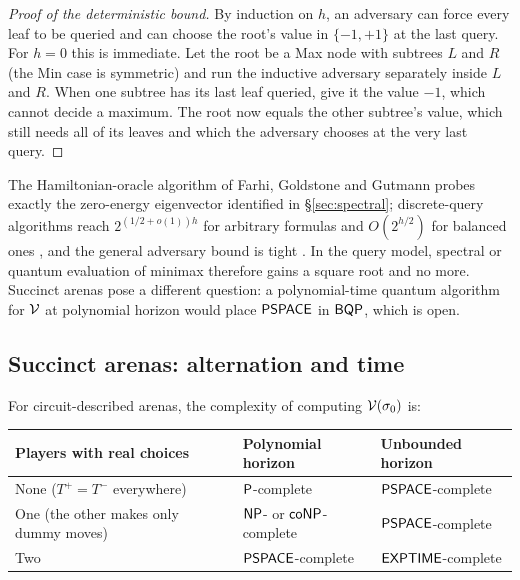 \begin{proof}[Proof of the deterministic bound]
By induction on $h$, an adversary can force every leaf to be queried and can choose the root's value in $\{-1,+1\}$ at the last query. For $h=0$ this is immediate. Let the root be a Max node with subtrees $L$ and $R$ (the Min case is symmetric) and run the inductive adversary separately inside $L$ and $R$. When one subtree has its last leaf queried, give it the value $-1$, which cannot decide a maximum. The root now equals the other subtree's value, which still needs all of its leaves and which the adversary chooses at the very last query.
\end{proof}

The Hamiltonian-oracle algorithm of Farhi, Goldstone and Gutmann \cite{FGG} probes exactly the zero-energy eigenvector identified in \S\ref{sec:spectral}; discrete-query algorithms reach $2^{(1/2+o(1))h}$ for arbitrary formulas \cite{CCJY,ACRSZ} and $O(2^{h/2})$ for balanced ones \cite{ACRSZ}, and the general adversary bound is tight \cite{Reichardt}. In the query model, spectral or quantum evaluation of minimax therefore gains a square root and no more. Succinct arenas pose a different question: a polynomial-time quantum algorithm for $\mathcal{V}$ at polynomial horizon would place $\mathsf{PSPACE}$ in $\mathsf{BQP}$, which is open.

\subsection{Succinct arenas: alternation and time}

\begin{theorem}\label{thm:alternation}
For circuit-described arenas, the complexity of computing $\mathcal{V}(\sigma_0)$ is:
\begin{center}\small
\begin{tabularx}{\linewidth}{@{}>{\raggedright\arraybackslash}Xll@{}}
\toprule
Players with real choices & Polynomial horizon & Unbounded horizon\\ \midrule
None ($T^{+}=T^{-}$ everywhere) & $\mathsf{P}$-complete & $\mathsf{PSPACE}$-complete\\
One (the other makes only dummy moves) & $\mathsf{NP}$- or $\mathsf{coNP}$-complete & $\mathsf{PSPACE}$-complete\\
Two & $\mathsf{PSPACE}$-complete & $\mathsf{EXPTIME}$-complete\\
\bottomrule
\end{tabularx}
\end{center}
\end{theorem}

